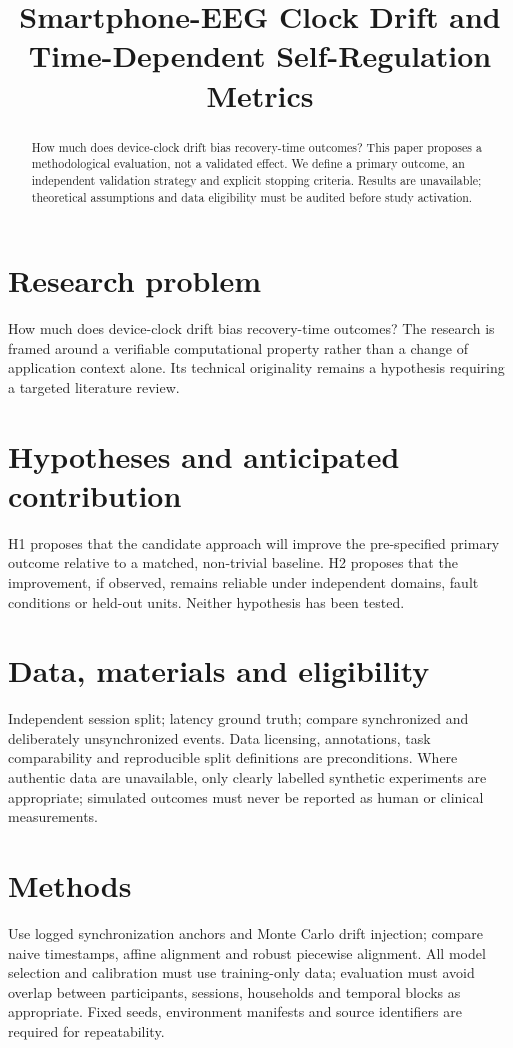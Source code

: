\documentclass[11pt,a4paper]{article}
\title{Smartphone-EEG Clock Drift and Time-Dependent Self-Regulation Metrics}
\author{}
\date{}
\begin{document}
\maketitle
\begin{abstract}
How much does device-clock drift bias recovery-time outcomes? This paper proposes a methodological evaluation, not a validated effect. We define a primary outcome, an independent validation strategy and explicit stopping criteria. Results are unavailable; theoretical assumptions and data eligibility must be audited before study activation.
\end{abstract}
\section{Research problem}
How much does device-clock drift bias recovery-time outcomes? The research is framed around a verifiable computational property rather than a change of application context alone. Its technical originality remains a hypothesis requiring a targeted literature review.
\section{Hypotheses and anticipated contribution}
H1 proposes that the candidate approach will improve the pre-specified primary outcome relative to a matched, non-trivial baseline. H2 proposes that the improvement, if observed, remains reliable under independent domains, fault conditions or held-out units. Neither hypothesis has been tested.
\section{Data, materials and eligibility}
Independent session split; latency ground truth; compare synchronized and deliberately unsynchronized events. Data licensing, annotations, task comparability and reproducible split definitions are preconditions. Where authentic data are unavailable, only clearly labelled synthetic experiments are appropriate; simulated outcomes must never be reported as human or clinical measurements.
\section{Methods}
Use logged synchronization anchors and Monte Carlo drift injection; compare naive timestamps, affine alignment and robust piecewise alignment. All model selection and calibration must use training-only data; evaluation must avoid overlap between participants, sessions, households and temporal blocks as appropriate. Fixed seeds, environment manifests and source identifiers are required for repeatability.
\end{document}

